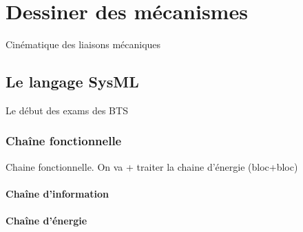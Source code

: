 \documentclass[
	11pt, %
	fleqn, %
	a4paper, %
]{LegrandOrangeBook}
\begin{document}

\chapter{Dessiner des mécanismes}
\begin{corollary}[S3.1.1]
Cinématique des liaisons mécaniques
\end{corollary}

\section{Le langage SysML}
Le début des exams des BTS

\subsection{Chaîne fonctionnelle}
Chaine fonctionnelle. On va + traiter la chaine d'énergie (bloc+bloc)
\subsubsection{Chaîne d'information}
\subsubsection{Chaîne d'énergie}
\end{document}

